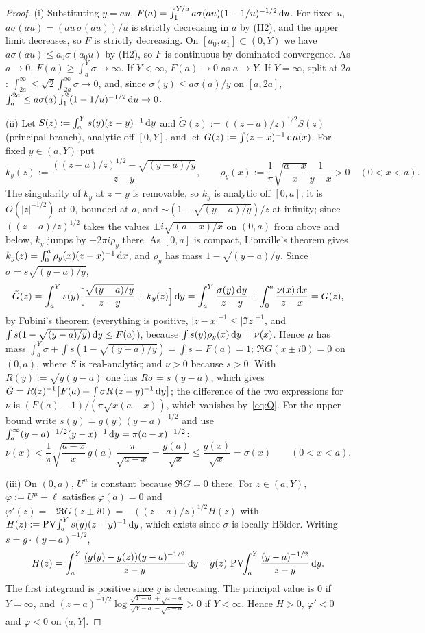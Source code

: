 \begin{proof}
(i) Substituting $y=au$, $F(a)=\int_1^{Y/a}a\sigma(au)(1-1/u)^{-1/2}\,\mathrm{d} u$. For fixed $u$, $a\sigma(au)=(au\,\sigma(au))/u$
is strictly decreasing in $a$ by (H2), and the upper limit decreases, so $F$ is strictly decreasing. On $[a_0,a_1]\subset(0,Y)$
we have $a\sigma(au)\le a_0\sigma(a_0u)$ by (H2), so $F$ is continuous by dominated convergence. As $a\to0$,
$F(a)\ge\int_a^Y\sigma\to\infty$. If $Y<\infty$, $F(a)\to0$ as $a\to Y$. If $Y=\infty$, split at $2a$: $\int_{2a}^\infty\le
\sqrt2\int_{2a}^\infty\sigma\to0$, and, since $\sigma(y)\le a\sigma(a)/y$ on $[a,2a]$, $\int_a^{2a}\le
a\sigma(a)\int_1^2(1-1/u)^{-1/2}\,\mathrm{d} u\to0$.

(ii) Let $S(z):=\int_a^Ys(y)(z-y)^{-1}\,\mathrm{d} y$ and $\tilde G(z):=((z-a)/z)^{1/2}S(z)$ (principal branch), analytic off
$[0,Y]$, and let $G(z):=\int(z-x)^{-1}\,\mathrm{d}\mu(x)$. For fixed $y\in(a,Y)$ put
\[
  k_y(z):=\frac{((z-a)/z)^{1/2}-\sqrt{(y-a)/y}}{z-y},\qquad \rho_y(x):=\frac1\pi\sqrt{\frac{a-x}x}\,\frac1{y-x}>0\quad(0<x<a).
\]
The singularity of $k_y$ at $z=y$ is removable, so $k_y$ is analytic off $[0,a]$; it is $O(|z|^{-1/2})$ at $0$, bounded
at $a$, and $\sim(1-\sqrt{(y-a)/y})/z$ at infinity; since $((z-a)/z)^{1/2}$ takes the values $\pm i\sqrt{(a-x)/x}$ on
$(0,a)$ from above and below, $k_y$ jumps by $-2\pi i\rho_y$ there. As $[0,a]$ is compact, Liouville's theorem gives
$k_y(z)=\int_0^a\rho_y(x)(z-x)^{-1}\,\mathrm{d} x$, and $\rho_y$ has mass $1-\sqrt{(y-a)/y}$. Since $\sigma=s\sqrt{(y-a)/y}$,
\[
  \tilde G(z)=\int_a^Ys(y)\Bigl[\frac{\sqrt{(y-a)/y}}{z-y}+k_y(z)\Bigr]\,\mathrm{d} y
  =\int_a^Y\frac{\sigma(y)\,\mathrm{d} y}{z-y}+\int_0^a\frac{\nu(x)\,\mathrm{d} x}{z-x}=G(z),
\]
by Fubini's theorem (everything is positive, $|z-x|^{-1}\le|\Im z|^{-1}$, and $\int s(1-\sqrt{(y-a)/y})\,\mathrm{d} y\le F(a)$),
because $\int s(y)\rho_y(x)\,\mathrm{d} y=\nu(x)$. Hence $\mu$ has mass $\int_a^Y\sigma+\int s(1-\sqrt{(y-a)/y})=\int s=F(a)=1$;
$\Re G(x\pm i0)=0$ on $(0,a)$, where $S$ is real-analytic; and $\nu>0$ because $s>0$. With $R(y):=\sqrt{y(y-a)}$ one has $R\sigma=s\,(y-a)$, which gives
$\tilde G=R(z)^{-1}\bigl[F(a)+\int\sigma R\,(z-y)^{-1}\,\mathrm{d} y\bigr]$; the difference of the two expressions for $\nu$ is
$(F(a)-1)/(\pi\sqrt{x(a-x)})$, which vanishes by~\eqref{eq:Q}. For the upper bound write $s(y)=g(y)(y-a)^{-1/2}$ and use
$\int_a^\infty(y-a)^{-1/2}(y-x)^{-1}\,\mathrm{d} y=\pi(a-x)^{-1/2}$:
\[
  \nu(x)<\frac1\pi\sqrt{\frac{a-x}x}\,g(a)\,\frac\pi{\sqrt{a-x}}=\frac{g(a)}{\sqrt x}\le\frac{g(x)}{\sqrt x}=\sigma(x)
  \qquad(0<x<a).
\]

(iii) On $(0,a)$, $U^\mu$ is constant because $\Re G=0$ there. For $z\in(a,Y)$, $\varphi:=U^\mu-\ell$ satisfies
$\varphi(a)=0$ and $\varphi'(z)=-\Re G(z\pm i0)=-((z-a)/z)^{1/2}H(z)$ with $H(z):=\operatorname{PV}\!\int_a^Ys(y)(z-y)^{-1}\,\mathrm{d} y$, which
exists since $\sigma$ is locally H\"older. Writing $s=g\cdot(y-a)^{-1/2}$,
\[
  H(z)=\int_a^Y\frac{(g(y)-g(z))(y-a)^{-1/2}}{z-y}\,\mathrm{d} y+g(z)\,\operatorname{PV}\!\!\int_a^Y\frac{(y-a)^{-1/2}}{z-y}\,\mathrm{d} y .
\]
The first integrand is positive since $g$ is decreasing. The principal value is $0$ if $Y=\infty$, and
$(z-a)^{-1/2}\log\frac{\sqrt{Y-a}+\sqrt{z-a}}{\sqrt{Y-a}-\sqrt{z-a}}>0$ if $Y<\infty$. Hence $H>0$, $\varphi'<0$ and
$\varphi<0$ on $(a,Y]$.


\end{proof}

